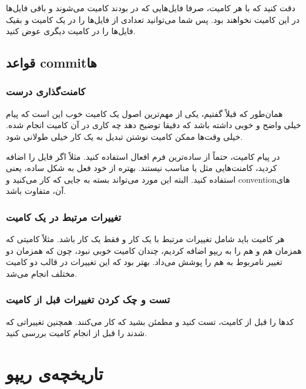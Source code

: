 دقت کنید که با هر کامیت، صرفا فایل‌هایی که در  بودند
کامیت می‌شوند و باقی فایل‌ها در این کامیت نخواهند بود. پس شما می‌توانید
تعدادی از فایل‌ها را در یک کامیت و بقیک فایل‌ها را در کامیت دیگری عوض
کنید.

\subsection{قواعد commitها}

\subsubsection{کامنت‌گذاری درست}

همان‌طور که قبلاً گفتیم، یکی از مهم‌ترین اصول یک کامیت خوب این است که پیام
خیلی واضح و خوبی داشته باشد که دقیقا توضیح دهد چه کاری در آن کامیت انجام
شده. خیلی وقت‌ها ممکن کامیت نوشتن تبدیل به یک کار خیلی طولانی شود.

در پیام کامیت، حتماً از ساده‌ترین فرم افعال استفاده کنید. مثلاً اگر فایل
 را اضافه کردید، کامنت‌هایی مثل
 یا 
مناسب نیستند. بهتره از خود فعل به شکل ساده، یعنی
 استفاده کنید. البته این مورد می‌تواند بسته
به جایی که کار می‌کنید و conventionهای آن، متفاوت باشد.

\subsubsection{تغییرات مرتبط در یک کامیت}

هر کامیت باید شامل تغییرات مرتبط با یک کار و فقط یک کار باشد. مثلاً
کامیتی که همزمان هم  و هم 
را به ریپو اضافه کردیم، چندان کامیت خوبی نبود، چون که همزمان دو تغییر
نامربوط به هم را پوشش می‌داد. بهتر بود که این تغییرات در قالب دو کامیت
مختلف انجام می‌شد.

\subsubsection{تست و چک کردن تغییرات قبل از کامیت}

کدها را قبل از کامیت، تست کنید و مطمئن بشید که کار می‌کنند. همچنین
تغییراتی که  شدند را قبل از انجام کامیت بررسی کنید.

\section{تاریخچه‌ی ریپو}

